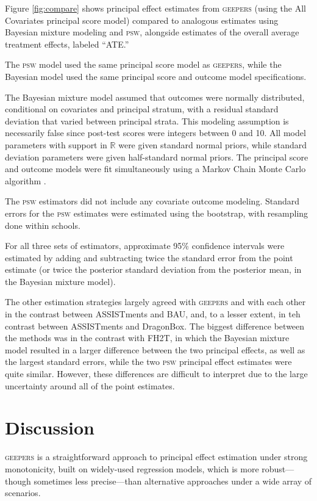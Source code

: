 \documentclass[]{article}
\begin{document}
Figure \ref{fig:compare} shows principal effect estimates from \textsc{geepers} (using the All Covariates principal score model) compared to analogous estimates using Bayesian mixture modeling and \textsc{psw}, alongside estimates of the overall average treatment effects, labeled ``ATE.''

The \textsc{psw} model used the same principal score model as \textsc{geepers}, while the Bayesian model used the same principal score and outcome model specifications.

The Bayesian mixture model assumed that outcomes were normally distributed, conditional on covariates and principal stratum, with a residual standard deviation that varied between principal strata. This modeling assumption is necessarily false since post-test scores were integers between 0 and 10. All model parameters with support in $\mathbb{R}$ were given standard normal priors, while standard deviation parameters were given half-standard normal priors.
The principal score and outcome models were fit simultaneously using a Markov Chain Monte Carlo algorithm \citep{rstan}.

The \textsc{psw} estimators did not include any covariate outcome modeling. Standard errors for the \textsc{psw} estimates were estimated using the bootstrap, with resampling done within schools.

For all three sets of estimators, approximate 95\% confidence intervals were estimated by adding and subtracting twice the standard error from the point estimate (or twice the posterior standard deviation from the posterior mean, in the Bayesian mixture model).

The other estimation strategies largely agreed with \textsc{geepers} and with each other in the contrast between ASSISTments and BAU, and, to a lesser extent, in teh contrast between ASSISTments and DragonBox. The biggest difference between the methods was in the contrast with FH2T, in which the Bayesian mixture model resulted in a larger difference between the two principal effects, as well as the largest standard errors, while the two \textsc{psw} principal effect estimates were quite similar.  However, these differences are difficult to interpret due to the large uncertainty around all of the point estimates.

\section{Discussion}\label{sec:discussion}
\textsc{geepers} is a straightforward approach to principal effect estimation under strong monotonicity, built on widely-used regression models, which is more robust---though sometimes less precise---than alternative approaches under a wide array of scenarios.
\end{document}
